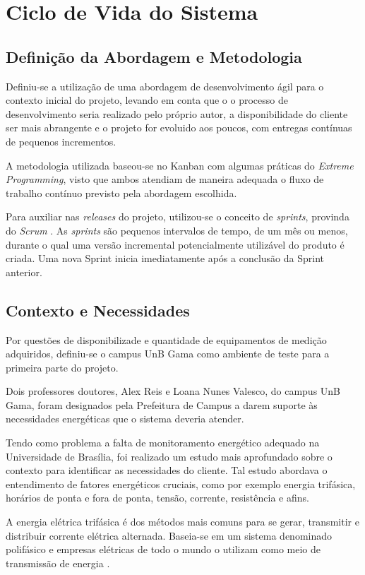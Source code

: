 \chapter{Ciclo de Vida do Sistema}
\section{Definição da Abordagem e Metodologia}
Definiu-se a utilização de uma abordagem de desenvolvimento ágil \cite{beck2001agile} para o contexto inicial do projeto, levando em conta que o o processo de desenvolvimento seria realizado pelo próprio autor, a disponibilidade do cliente ser mais abrangente e o projeto for evoluido aos poucos, com entregas contínuas de pequenos incrementos.

A metodologia utilizada baseou-se no Kanban \cite{radigan_2015} com algumas práticas do \textit{Extreme Programming}, visto que ambos atendiam de maneira adequada o fluxo de trabalho contínuo previsto pela abordagem escolhida.

Para auxiliar nas \textit{releases} do projeto, utilizou-se o conceito de \textit{sprints}, provinda do \textit{Scrum} \cite{scrum_guide}. As \textit{sprints} são pequenos intervalos de tempo, de um mês ou menos, durante o qual uma versão incremental potencialmente utilizável do produto é criada. Uma nova Sprint inicia imediatamente após a conclusão da Sprint anterior.

\section{Contexto e Necessidades}
Por questões de disponibilizade e quantidade de equipamentos de medição adquiridos, definiu-se o campus UnB Gama como ambiente de teste para a primeira parte do projeto.

Dois professores doutores, Alex Reis e Loana Nunes Valesco, do campus UnB Gama, foram designados pela Prefeitura de Campus a darem suporte às necessidades energéticas que o sistema deveria atender.

Tendo como problema a falta de monitoramento energético adequado na Universidade de Brasília, foi realizado um estudo mais aprofundado sobre o contexto para identificar as necessidades do cliente. Tal estudo abordava o entendimento de fatores energéticos cruciais, como por exemplo energia trifásica, horários de ponta e fora de ponta, tensão, corrente, resistência e afins.

A energia elétrica trifásica é dos métodos mais comuns para se gerar, transmitir e distribuir corrente elétrica alternada. Baseia-se em um sistema denominado polifásico e empresas elétricas de todo o mundo o utilizam como meio de transmissão de energia \cite{stevenson_1962}.

